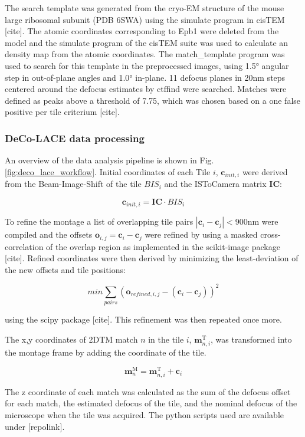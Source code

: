 \documentclass[
]{article}
\begin{document}
The search template was generated from the cryo-EM structure of the mouse large
ribosomal subunit (PDB 6SWA) using the simulate program in cisTEM {[}cite{]}. The
atomic coordinates corresponding to Epb1 were deleted from the model and the
simulate program of the cisTEM suite was used to calculate an density map from
the atomic coordinates. The match\_template program was used to search for this
template in the preprocessed images, using 1.5° angular step in out-of-plane
angles and 1.0° in-plane. 11 defocus planes in 20nm steps centered around
the defocus estimates by ctffind were searched. Matches were defined as peaks
above a threshold of 7.75, which was chosen based on a one false positive per
tile criterium {[}cite{]}.

\hypertarget{deco-lace-data-processing}{%
\subsubsection{DeCo-LACE data processing}\label{deco-lace-data-processing}}

An overview of the data analysis pipeline is shown in Fig.
\ref{fig:deco_lace_workflow}. Initial coordinates of each Tile \(i\), \(\textbf{c}_{init,i}\) were derived
from the Beam-Image-Shift of the tile \(BIS_i\) and the ISToCamera matrix
\(\mathbf{IC}\):

\[\textbf{c}_{init,i} = \mathbf{IC} \cdot BIS_i\]

To refine the montage a list of overlapping tile pairs
\(|\textbf{c}_i-\textbf{c}_j| < 900\textrm{nm}\) were compiled and the offsets
\(\textbf{o}_{i,j} = \textbf{c}_i-\textbf{c}_j\) were refined by using a masked
cross-correlation of the overlap region as implemented in the scikit-image
package {[}cite{]}. Refined coordinates were then derived by minimizing the
least-deviation of the new offsets and tile positions:

\[ min\sum_{pairs}{(\textbf{o}_{refined,i,j} - (\textbf{c}_i-\textbf{c}_j))^2}\]

using the scipy package {[}cite{]}. This refinement was then repeated once more.

The x,y coordinates of 2DTM match \(n\) in the tile \(i\), \(\textbf{m}^\textrm{T}_{n,i}\), was
transformed into the montage frame by adding the coordinate of the tile.

\[ \textbf{m}^\textrm{M}_n = \textbf{m}^\textrm{T}_{n,i} +
\textbf{c}_i\]

The z coordinate of each match was calculated as the sum of the defocus offset
for each match, the estimated defocus of the tile, and the nominal defocus of
the microscope when the tile was acquired. The python scripts used are available
under {[}repolink{]}.
\end{document}
